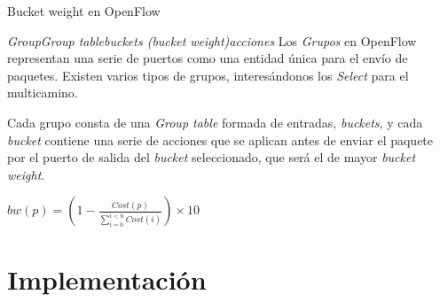 \documentclass[10pt,spanish,xcolor={svgnames}]{beamer}
\begin{document}
\begin{frame}{Bucket weight en OpenFlow}
\vspace*{-0.1em}
\begin{alertblock}{\large \emph{Group}\rightarrow \emph{Group table}\rightarrow \emph{buckets (bucket weight)}\rightarrow \emph{acciones}}
\vspace*{1em}
Los \emph{Grupos} en OpenFlow representan una serie de puertos como una entidad única para el envío de paquetes. Existen varios tipos de grupos, interesándonos los \emph{Select} para el multicamino. 
\vspace*{0.6em}

Cada grupo consta de una \emph{Group table} formada de entradas, \emph{buckets}, y cada \emph{bucket} contiene una serie de acciones que se aplican antes de enviar el paquete por el puerto de salida del \emph{bucket} seleccionado, que será el de mayor \emph{bucket weight}.
\vspace*{1em}

\large$bw(p) = \left( 1 - \frac{Cost(p)}{\sum_{i=0}^{i<n} Cost(i)}\right)\times{10}$
\end{alertblock}
\end{frame}



\section{Implementación}
\end{document}
